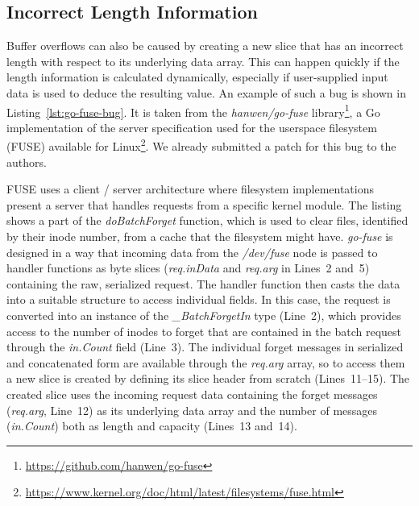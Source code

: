 
\subsection{Incorrect Length Information}\label{subsec:unsafe-security-problems:slice-casts:incorrect-length}

Buffer overflows can also be caused by creating a new slice that has an incorrect length with respect to its underlying
data array.
This can happen quickly if the length information is calculated dynamically, especially if user-supplied input data is
used to deduce the resulting value.
An example of such a bug is shown in Listing~\ref{lst:go-fuse-bug}.
It is taken from the \textit{hanwen/go-fuse} library\footnote{\url{https://github.com/hanwen/go-fuse}}, a Go
implementation of the server specification used for the userspace filesystem (\acrshort{FUSE}) available for
Linux\footnote{\url{https://www.kernel.org/doc/html/latest/filesystems/fuse.html}}.
We already submitted a patch for this bug to the authors.



\acrshort{FUSE} uses a client / server architecture where filesystem implementations present a server that handles
requests from a specific kernel module.
The listing shows a part of the \textit{doBatchForget} function, which is used to clear files, identified by their inode
number, from a cache that the filesystem might have.
\textit{go-fuse} is designed in a way that incoming data from the \textit{/dev/fuse} node is passed to handler functions
as byte slices (\textit{req.inData} and \textit{req.arg} in Lines~2 and~5) containing the raw, serialized request.
The handler function then casts the data into a suitable structure to access individual fields.
In this case, the request is converted into an instance of the \textit{\_BatchForgetIn} type (Line~2), which provides
access to the number of inodes to forget that are contained in the batch request through the \textit{in.Count} field
(Line~3).
The individual forget messages in serialized and concatenated form are available through the \textit{req.arg} array, so
to access them a new slice is created by defining its slice header from scratch (Lines~11--15).
The created slice uses the incoming request data containing the forget messages (\textit{req.arg}, Line~12) as its
underlying data array and the number of messages (\textit{in.Count}) both as length and capacity (Lines~13 and~14).

